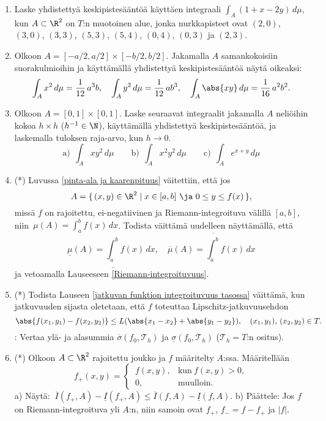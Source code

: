 \begin{enumerate}
\item 
Laske yhdistettyä keskipistesääntöä käyttäen integraali $\int_A (1+x-2 y)\,d\mu$, kun 
$A\subset\R^2$ on $T$:n muotoinen alue, jonka nurkkapisteet ovat $(2,0)$, $(3,0)$, $(3,3)$, 
$(5,3)$, $(5,4)$, $(0,4)$, $(0,3)$ ja $(2,3)$.

\item \label{H-uint-1: toisen asteen integraalit}
Olkoon $A=[-a/2,a/2]\times[-b/2,b/2]$. Jakamalla $A$ samankokoisiin suorakulmioihin ja 
käyttämällä yhdistettyä keskipistesääntöä näytä oikeaksi:
\[
\int_A x^2\,d\mu=\frac{1}{12}\,a^3b, \quad
\int_A y^2\,d\mu=\frac{1}{12}\,ab^3, \quad
\int_A \abs{xy}\,d\mu=\frac{1}{16}\,a^2b^2.
\]

\item 
Olkoon $A = [0,1] \times [0,1]$. Laske seuraavat integraalit jakamalla $A$ neliöihin kokoa 
$h \times h$ ($h^{-1}\in\N$), käyttämällä yhdistettyä keskipistesääntöä, ja laskemalla tuloksen
raja-arvo, kun $h \to 0$.
\[
\text{a)}\ \ \int_A xy^2\,d\mu \qquad
\text{b)}\ \ \int_A x^2y^2\,d\mu \qquad
\text{c)}\ \ \int_A e^{x+y}\,d\mu
\]

\item (*)
Luvussa \ref{pinta-ala ja kaarenpituus} väitettiin, että jos
\[
A = \{\,(x,y) \in \R^2 \mid x \in [a,b]\ \ja\ 0 \le y \le f(x)\,\},
\]
missä $f$ on rajoitettu, ei-negatiivinen ja Riemann-integroituva välillä $[a,b]$, niin
$\,\mu(A)=\int_a^b f(x)\,dx$. Todista väittämä uudelleen näyttämällä, että
\[ 
\underline{\mu}(A) = \underline{\int_a^b} f(x)\,dx, \quad 
\overline{\mu}(A) = \overline{\int_a^b} f(x)\,dx 
\]
ja vetoamalla Lauseeseen \ref{Riemann-integroituvuus}.

\item (*) \label{H-uint-1: integroituvuus L-ehdolla}
Todista Lauseen \ref{jatkuvan funktion integroituvuus tasossa} väittämä, kun jatkuvuuden
sijasta oletetaan, että $f$ toteuttaa Lipschitz-jatkuvuusehdon
\[
\abs{f(x_1,y_1)-f(x_2,y_2)} \le L(\abs{x_1-x_2}+\abs{y_1-y_2}), \quad 
                                              (x_1,y_1),\,(x_2,y_2) \in T.
\]
: Vertaa ylä- ja alasummia $\overline{\sigma}(f_0,\mathcal{T}_h)$ ja
$\underline{\sigma}(f_0,\mathcal{T}_h)$ ($\mathcal{T}_h=T$:n ositus).

\item (*) \label{H-uint-1: fplus ja fmiinus}
Olkoon $A\subset\R^2$ rajoitettu joukko ja $f$ määritelty $A$:ssa. Määritellään
\[
f_+(x,y) = \begin{cases} 
            \,f(x,y), &\text{kun}\ f(x,y)>0, \\ 
            \,0,      &\text{muulloin}. 
           \end{cases}
\]
a) Näytä: $\ \overline{I}(f_+,A)-\underline{I}(f_+,A) \le \overline{I}(f,A)-\underline{I}(f,A)$.
\vspace{1mm}\newline
b) Päättele: Jos $f$ on Riemann-integroituva yli $A$:n, niin samoin ovat $f_+$, $f_-=f-f_+$ ja
$|f|$. 


\end{enumerate}
